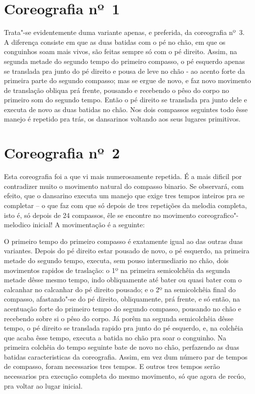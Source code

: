 \section{Coreografia nº~1}

Trata"-se evidentemente duma variante apenas, e preferida, da coreografia
nº~3. A diferença consiste em que as duas batidas com o pé no chão, em
que os conguinhos soam mais vivos, são feitas sempre só com o pé
direito. Assim, na segunda metade do segundo tempo do primeiro compasso,
o pé esquerdo apenas se translada pra junto do pé direito e pousa de
leve no chão - ao acento forte da primeira parte do segundo compasso;
mas se ergue de novo, e faz novo movimento de translação obliqua prá
frente, pousando e recebendo o pêso do corpo no primeiro som do segundo
tempo. Então o pé direito se translada pra junto dele e executa de novo
as duas batidas no chão. Nos dois compassos seguintes todo êsse manejo é
repetido pra trás, os dansarinos voltando aos seus lugares primitivos.

\section{Coreografia nº~2}

Esta coreografia foi a que vi mais numerosamente repetida. É a mais
dificil por contradizer muito o movimento natural do compasso binario.
Se observará, com efeito, que o dansarino executa um manejo que exige
tres tempos inteiros pra se completar -- o que faz com que só depois de
tres repetições da melodia completa, isto é, só depois de 24 compassos,
êle se encontre no movimento coreografico"-melodico inicial! A
movimentação é a seguinte:

O primeiro tempo do primeiro compasso é exatamente igual ao das outras
duas variantes. Depois do pé direito estar pousado de novo, o pé
esquerdo, na primeira metade do segundo tempo, executa, sem pouso
intermediario no chão, dois movimentos rapidos de traslação: o 1º na
primeira semicolchêia da segunda metade dêsse mesmo tempo, indo
obliquamente até bater ou quasi bater com o calcanhar no calcanhar do pé
direito pousado; e o 2º na semicolchêia final do compasso, afastando"-se
do pé direito, obliquamente, prá frente, e só então, na acentuação forte
do primeiro tempo do segundo compasso, pousando no chão e recebendo
sobre si o pêso do corpo. Já porêm na segunda semicolchêia dêsse tempo,
o pé direito se translada rapido pra junto do pé esquerdo, e, na
colchêia que acaba êsse tempo, executa a batida no chão pra soar o
conguinho. Na primeira colchêia do tempo seguinte bate de novo no chão,
perfazendo as duas batidas caracteristicas da coreografia. Assim, em vez
dum número par de tempos de compasso, foram necessarios tres tempos. E
outros tres tempos serão necessarios pra execução completa do mesmo
movimento, só que agora de recúo, pra voltar ao lugar inicial.

